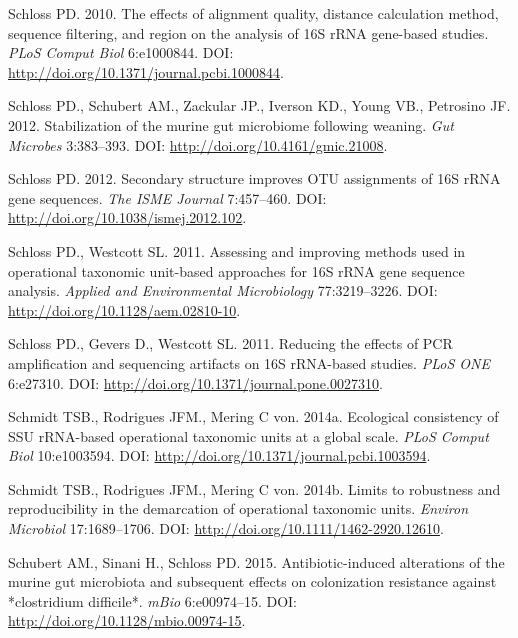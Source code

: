 \documentclass[11pt,]{article}
\begin{document}
Schloss PD. 2010. The effects of alignment quality, distance calculation
method, sequence filtering, and region on the analysis of 16S rRNA
gene-based studies. \emph{PLoS Comput Biol} 6:e1000844. DOI:
\url{http://doi.org/10.1371/journal.pcbi.1000844}.

Schloss PD., Schubert AM., Zackular JP., Iverson KD., Young VB.,
Petrosino JF. 2012. Stabilization of the murine gut microbiome following
weaning. \emph{Gut Microbes} 3:383--393. DOI:
\url{http://doi.org/10.4161/gmic.21008}.

Schloss PD. 2012. Secondary structure improves OTU assignments of 16S
rRNA gene sequences. \emph{The ISME Journal} 7:457--460. DOI:
\url{http://doi.org/10.1038/ismej.2012.102}.

Schloss PD., Westcott SL. 2011. Assessing and improving methods used in
operational taxonomic unit-based approaches for 16S rRNA gene sequence
analysis. \emph{Applied and Environmental Microbiology} 77:3219--3226.
DOI: \url{http://doi.org/10.1128/aem.02810-10}.

Schloss PD., Gevers D., Westcott SL. 2011. Reducing the effects of PCR
amplification and sequencing artifacts on 16S rRNA-based studies.
\emph{PLoS ONE} 6:e27310. DOI:
\url{http://doi.org/10.1371/journal.pone.0027310}.

Schmidt TSB., Rodrigues JFM., Mering C von. 2014a. Ecological
consistency of SSU rRNA-based operational taxonomic units at a global
scale. \emph{PLoS Comput Biol} 10:e1003594. DOI:
\url{http://doi.org/10.1371/journal.pcbi.1003594}.

Schmidt TSB., Rodrigues JFM., Mering C von. 2014b. Limits to robustness
and reproducibility in the demarcation of operational taxonomic units.
\emph{Environ Microbiol} 17:1689--1706. DOI:
\url{http://doi.org/10.1111/1462-2920.12610}.

Schubert AM., Sinani H., Schloss PD. 2015. Antibiotic-induced
alterations of the murine gut microbiota and subsequent effects on
colonization resistance against *clostridium difficile*. \emph{mBio}
6:e00974--15. DOI: \url{http://doi.org/10.1128/mbio.00974-15}.
\end{document}
